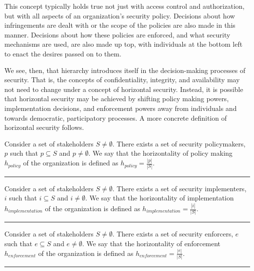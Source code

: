 This concept typically holds true not just with access control and
authorization, but with all aspects of an organization's security policy.
Decisions about how infringements are dealt with or the scope of the policies
are also made in this manner. Decisions about how these policies are enforced,
and what security mechanisms are used, are also made up top, with individuals at
the bottom left to enact the desires passed on to them.

We see, then, that hierarchy introduces itself in the decision-making processes
of security. That is, the concepts of confidentiality, integrity, and availability
may not need to change under a concept of horizontal security. Instead, it is
possible that horizontal security may be achieved by shifting policy making
powers, implementation decisions, and enforcement powers away from individuals
and towards democratic, participatory processes. A more concrete definition of
horizontal security follows.

\begin{definition}
Consider a set of stakeholders $ S \neq \emptyset$. There exists a set of
security policymakers, $ p $ such that $ p \subseteq S $ and $p \neq 
\emptyset$. We say that the horizontality of policy making $h_{policy}$ of the
organization is defined as $ h_{policy} = \frac{|p|}{|S|} $.\\
\noindent\rule{.48\textwidth}{0.4pt}
\end{definition}

\begin{definition}
Consider a set of stakeholders $ S \neq \emptyset$. There exists a set of
security implementers, $ i $ such that $ i \subseteq S $ and $i \neq 
\emptyset$. We say that the horizontality of implementation $h_{implementation}$
of the organization is defined as $ h_{implementation} = \frac{|i|}{|S|} $.\\
\noindent\rule{.48\textwidth}{0.4pt}
\end{definition}

\begin{definition}
Consider a set of stakeholders $ S \neq \emptyset$. There exists a set of
security enforcers, $ e $ such that $ e \subseteq S $ and $e \neq \emptyset$.
We say that the horizontality of enforcement $h_{enforcement}$ of the
organization is defined as $ h_{enforcement} = \frac{|e|}{|S|} $.\\
\noindent\rule{.48\textwidth}{0.4pt}
\end{definition}

